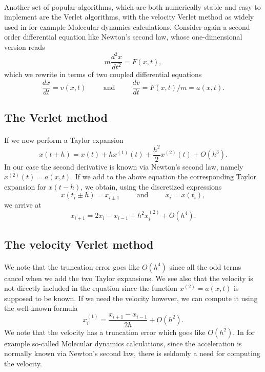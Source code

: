 \documentclass[%
oneside,                 %
final,                   %
10pt]{article}
\begin{document}
\paragraph{}
Another set of popular algorithms, which are both numerically stable and easy to implement are the
Verlet algorithms, with the velocity Verlet method as widely used in for example Molecular dynamics calculations. 
Consider again a second-order differential equation  like Newton's second law, whose one-dimensional
version reads
\[
m\frac{d^2 x}{dt^2}= F(x,t),
\]
which we rewrite in terms of two coupled differential equations
\[
\frac{dx}{dt}=v(x,t) \hspace{1cm}\mathrm{and}\hspace{1cm} \frac{dv}{dt}=F(x,t)/m=a(x,t).
\]



\subsection{The Verlet method}

\paragraph{}
If we now perform a Taylor expansion
\[
x(t+h) = x(t)+hx^{(1)}(t)+\frac{h^2}{2}x^{(2)}(t)+O(h^3).
\]
In our case the second derivative is known via Newton's second law, namely $x^{(2)}(t)=a(x,t)$.
If we add to the above equation the corresponding Taylor expansion for $x(t-h)$, we obtain, using the
discretized expressions
\[
x(t_i\pm h) = x_{i\pm 1} \hspace{1cm}\mathrm{and}\hspace{1cm} x_i=x(t_i),
\]
we arrive at 
\[
x_{i+1} = 2x_i - x_{i-1} +h^2x^{(2)}_i+O(h^4).
\]




\subsection{The velocity Verlet method}

\paragraph{}
We note that the truncation error goes like $O(h^4)$ since all the odd terms cancel when we add the two Taylor expansions.
We see also that the velocity is not directly included in the equation since the function
$x^{(2)}=a(x,t)$ is supposed to be known. If we need the velocity however, we can compute it using the well-known
formula
\[
x^{(1)}_i=\frac{x_{i+1}-x_{i-1}}{2h}+O(h^2).
\]
We note that the velocity has a truncation error which goes like $O(h^2)$. In for example so-called Molecular dynamics calculations,
since the acceleration is normally known via Newton's second law, there is seldomly a need for computing the velocity.
\end{document}
